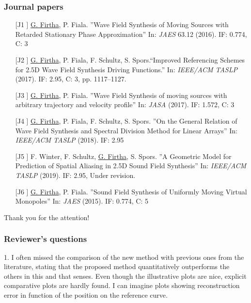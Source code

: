 \documentclass{beamer}
\begin{document}
\begin{frame}
\frametitle{Journal papers}
\begin{itemize}
\small 
\item [[J1]] \underline{G. Firtha}, P. Fiala. ''Wave Field Synthesis of Moving Sources with Retarded Stationary Phase Approximation'' In: \textit{JAES} 63.12 (2016). IF: 0.774, C: 3
\vspace{1mm}
%
\item [[J2]] \underline{G. Firtha}, P. Fiala, F. Schultz, S. Spors.“Improved Referencing Schemes for 2.5D Wave Field Synthesis Driving Functions.” In: \textit{IEEE/ACM TASLP} (2017). IF: 2.95, C: 3,
pp. 1117–1127.
\vspace{1mm}
%
\item [[J3]] \underline{G. Firtha}, P. Fiala. ''Wave Field Synthesis of moving sources with arbitrary trajectory and velocity profile'' In: \textit{JASA} (2017). IF: 1.572, C: 3
\vspace{1mm}
%
\item [[J4]] \underline{G. Firtha}, P. Fiala, F. Schultz, S. Spors. ''On the General Relation of Wave Field Synthesis and Spectral Division Method for Linear Arrays'' In: \textit{IEEE/ACM TASLP} (2018). IF: 2.95
\vspace{1mm}
%
\item [[J5]] F. Winter, F. Schultz, \underline{G. Firtha}, S. Spors. ''A Geometric Model for Prediction of Spatial Aliasing in 2.5D Sound Field Synthesis'' In: \textit{IEEE/ACM TASLP} (2019). IF: 2.95, Under revision.
\vspace{1mm}
%
\item [[J6]] \underline{G. Firtha}, P. Fiala. ''Sound Field Synthesis of Uniformly Moving Virtual Monopoles'' In: \textit{JAES} (2015). IF:
0.774, C: 5
\end{itemize}
\end{frame}


\begin{frame}
\Huge{\centerline{Thank you for the attention!}}
\end{frame}

\begin{frame}
\frametitle{Reviewer's questions}
1. I often missed the comparison of the new method with previous ones from the literature, stating that the proposed method quantitatively outperforms the others in this and that senses. Even though the illustrative plots are nice, explicit comparative plots are hardly found. I can imagine plots showing reconstruction error in function of the position on the reference curve.
\end{frame}
\end{document}
